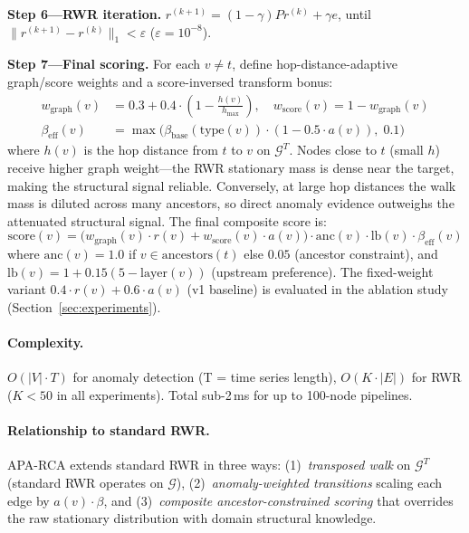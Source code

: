 \documentclass{article}
\newcommand{\aparca}{\textsc{APA-RCA}}
\begin{document}
\textbf{Step 6---RWR iteration.}
$r^{(k+1)} = (1-\gamma) P r^{(k)} + \gamma e$,
until $\|r^{(k+1)} - r^{(k)}\|_1 < \varepsilon$ ($\varepsilon = 10^{-8}$).

\textbf{Step 7---Final scoring.} For each $v \neq t$, define hop-distance-adaptive
graph/score weights and a score-inversed transform bonus:
\begin{align}
  w_{\text{graph}}(v) &= 0.3 + 0.4 \cdot \left(1 - \frac{h(v)}{h_{\max}}\right),\quad
  w_{\text{score}}(v) = 1 - w_{\text{graph}}(v) \label{eq:wgraph}\\
  \beta_{\text{eff}}(v) &= \max\!\bigl(\beta_{\text{base}}(\mathrm{type}(v))\cdot(1 - 0.5\cdot a(v)),\;0.1\bigr) \label{eq:betaeff}
\end{align}
where $h(v)$ is the hop distance from $t$ to $v$ on $\mathcal{G}^T$.
Nodes close to $t$ (small $h$) receive higher graph weight---the RWR stationary
mass is dense near the target, making the structural signal reliable.
Conversely, at large hop distances the walk mass is diluted across many ancestors,
so direct anomaly evidence outweighs the attenuated structural signal.
The final composite score is:
\begin{equation}
  \mathrm{score}(v) =
  \bigl(w_{\text{graph}}(v)\cdot r(v) + w_{\text{score}}(v)\cdot a(v)\bigr)
  \cdot \mathrm{anc}(v) \cdot \mathrm{lb}(v) \cdot \beta_{\text{eff}}(v)
\end{equation}
where $\mathrm{anc}(v) = 1.0$ if $v \in \mathrm{ancestors}(t)$ else $0.05$
(ancestor constraint), and $\mathrm{lb}(v) = 1 + 0.15(5 - \mathrm{layer}(v))$
(upstream preference).
The fixed-weight variant $0.4\cdot r(v) + 0.6\cdot a(v)$ (v1 baseline) is
evaluated in the ablation study (Section~\ref{sec:experiments}).

\paragraph{Complexity.}
$O(|V| \cdot T)$ for anomaly detection (T = time series length),
$O(K \cdot |E|)$ for RWR ($K < 50$ in all experiments).
Total sub-2\,ms for up to 100-node pipelines.

\paragraph{Relationship to standard RWR.}
\aparca{} extends standard RWR in three ways: (1)~\emph{transposed walk} on
$\mathcal{G}^T$ (standard RWR operates on $\mathcal{G}$), (2)~\emph{anomaly-weighted
transitions} scaling each edge by $a(v) \cdot \beta$, and (3)~\emph{composite
ancestor-constrained scoring} that overrides the raw stationary distribution
with domain structural knowledge.
\end{document}
